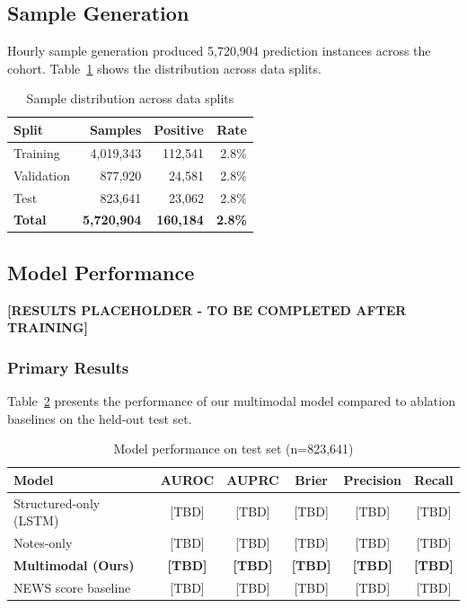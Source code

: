 \subsection{Sample Generation}

Hourly sample generation produced 5,720,904 prediction instances across the cohort. Table~\ref{tab:samples} shows the distribution across data splits.

\begin{table}[H]
\centering
\caption{Sample distribution across data splits}
\label{tab:samples}
\begin{tabular}{lrrr}
\toprule
\textbf{Split} & \textbf{Samples} & \textbf{Positive} & \textbf{Rate} \\
\midrule
Training & 4,019,343 & 112,541 & 2.8\% \\
Validation & 877,920 & 24,581 & 2.8\% \\
Test & 823,641 & 23,062 & 2.8\% \\
\midrule
\textbf{Total} & \textbf{5,720,904} & \textbf{160,184} & \textbf{2.8\%} \\
\bottomrule
\end{tabular}
\end{table}

\subsection{Model Performance}


\textbf{[RESULTS PLACEHOLDER - TO BE COMPLETED AFTER TRAINING]}

\subsubsection{Primary Results}

Table~\ref{tab:results} presents the performance of our multimodal model compared to ablation baselines on the held-out test set.

\begin{table}[H]
\centering
\caption{Model performance on test set (n=823,641)}
\label{tab:results}
\begin{tabular}{lccccc}
\toprule
\textbf{Model} & \textbf{AUROC} & \textbf{AUPRC} & \textbf{Brier} & \textbf{Precision} & \textbf{Recall} \\
\midrule
Structured-only (LSTM) & [TBD] & [TBD] & [TBD] & [TBD] & [TBD] \\
Notes-only & [TBD] & [TBD] & [TBD] & [TBD] & [TBD] \\
\textbf{Multimodal (Ours)} & \textbf{[TBD]} & \textbf{[TBD]} & \textbf{[TBD]} & \textbf{[TBD]} & \textbf{[TBD]} \\
\midrule
NEWS score baseline & [TBD] & [TBD] & [TBD] & [TBD] & [TBD] \\
\bottomrule
\end{tabular}
\end{table}

